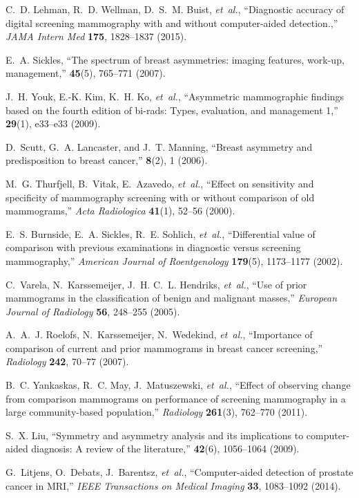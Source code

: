 \documentclass[12pt]{spieman}  %
\begin{document}
\begin{thebibliography}{10}
C.~D. Lehman, R.~D. Wellman, D.~S.~M. Buist, {\em et~al.}, ``Diagnostic
  accuracy of digital screening mammography with and without computer-aided
  detection.,'' {\em JAMA Intern Med} {\bf 175}, 1828--1837  (2015).

E.~A. Sickles, ``The spectrum of breast asymmetries: imaging features, work-up,
  management,''  {\bf 45}(5), 765--771  (2007).

J.~H. Youk, E.-K. Kim, K.~H. Ko, {\em et~al.}, ``Asymmetric mammographic
  findings based on the fourth edition of bi-rads: Types, evaluation, and
  management 1,''  {\bf 29}(1), e33--e33  (2009).

D.~Scutt, G.~A. Lancaster, and J.~T. Manning, ``Breast asymmetry and
  predisposition to breast cancer,''  {\bf 8}(2), 1  (2006).

M.~G. Thurfjell, B.~Vitak, E.~Azavedo, {\em et~al.}, ``Effect on sensitivity
  and specificity of mammography screening with or without comparison of old
  mammograms,'' {\em Acta Radiologica} {\bf 41}(1), 52--56  (2000).

E.~S. Burnside, E.~A. Sickles, R.~E. Sohlich, {\em et~al.}, ``Differential
  value of comparison with previous examinations in diagnostic versus screening
  mammography,'' {\em American Journal of Roentgenology} {\bf 179}(5),
  1173--1177  (2002).

C.~Varela, N.~Karssemeijer, J.~H. C.~L. Hendriks, {\em et~al.}, ``Use of prior
  mammograms in the classification of benign and malignant masses,'' {\em
  European Journal of Radiology} {\bf 56}, 248--255  (2005).

A.~A.~J. Roelofs, N.~Karssemeijer, N.~Wedekind, {\em et~al.}, ``Importance of
  comparison of current and prior mammograms in breast cancer screening,'' {\em
  Radiology} {\bf 242}, 70--77  (2007).

B.~C. Yankaskas, R.~C. May, J.~Matuszewski, {\em et~al.}, ``Effect of observing
  change from comparison mammograms on performance of screening mammography in
  a large community-based population,'' {\em Radiology} {\bf 261}(3), 762--770
  (2011).

S.~X. Liu, ``Symmetry and asymmetry analysis and its implications to
  computer-aided diagnosis: A review of the literature,''  {\bf 42}(6),
  1056--1064  (2009).

G.~Litjens, O.~Debats, J.~Barentsz, {\em et~al.}, ``Computer-aided detection of
  prostate cancer in {MRI},'' {\em IEEE Transactions on Medical Imaging} {\bf
  33}, 1083--1092  (2014).


\end{thebibliography}
\end{document}
